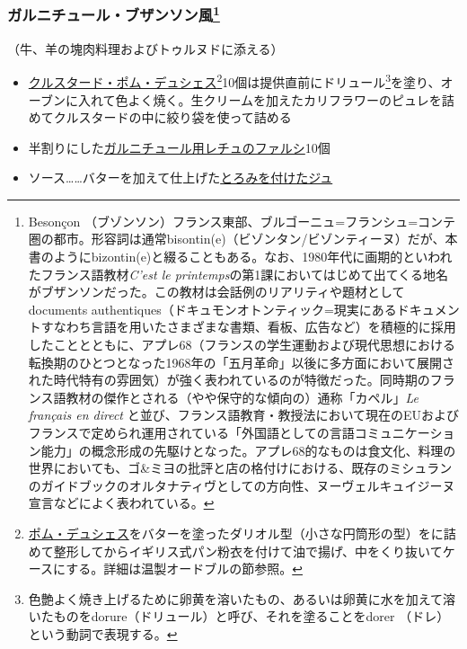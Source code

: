 \begin{recette}
\hypertarget{garniture-bezontinne}{%
\subsubsection[ガルニチュール・ブザンソン風]{\texorpdfstring{ガルニチュール・ブザンソン風\footnote{Besonçon
  （ブゾンソン）フランス東部、ブルゴーニュ=フランシュ=コンテ圏の都市。形容詞は通常bisontin(e)（ビゾンタン/ビゾンティーヌ）だが、本書のようにbizontin(e)と綴ることもある。なお、1980年代に画期的といわれたフランス語教材\emph{C'est
  le
  printemps}の第1課においてはじめて出てくる地名がブザンソンだった。この教材は会話例のリアリティや題材としてdocuments
  authentiques（ドキュモンオトンティック=現実にあるドキュメントすなわち言語を用いたさまざまな書類、看板、広告など）を積極的に採用したこととともに、アプレ68（フランスの学生運動および現代思想における転換期のひとつとなった1968年の「五月革命」以後に多方面において展開された時代特有の雰囲気）が強く表われているのが特徴だった。同時期のフランス語教材の傑作とされる（やや保守的な傾向の）通称「カペル」\emph{Le
  français en direct}
  と並び、フランス語教育・教授法において現在のEUおよびフランスで定められ運用されている「外国語としての言語コミュニケーション能力」の概念形成の先駆けとなった。アプレ68的なものは食文化、料理の世界においても、ゴ\&ミヨの批評と店の格付けにおける、既存のミシュランのガイドブックのオルタナティヴとしての方向性、ヌーヴェルキュイジーヌ宣言などによく表われている。}}{ガルニチュール・ブザンソン風}}\label{garniture-bezontinne}}



（牛、羊の塊肉料理およびトゥルヌドに添える）

\begin{itemize}
\item
  \protect\hyperlink{croustade-en-pomme-duchesse}{クルスタード・ポム・デュシェス}\footnote{\protect\hyperlink{pomme-de-terre-duchesse}{ポム・デュシェス}をバターを塗ったダリオル型（小さな円筒形の型）をに詰めて整形してからイギリス式パン粉衣を付けて油で揚げ、中をくり抜いてケースにする。詳細は温製オードブルの節参照。}10個は提供直前にドリュール\footnote{色艶よく焼き上げるために卵黄を溶いたもの、あるいは卵黄に水を加えて溶いたものをdorure（ドリュール）と呼び、それを塗ることをdorer
    （ドレ）という動詞で表現する。}を塗り、オーブンに入れて色よく焼く。生クリームを加えたカリフラワーのピュレを詰めてクルスタードの中に絞り袋を使って詰める
\item
  半割りにした\protect\hyperlink{laitues-farcies-pour-garniture}{ガルニチュール用レチュのファルシ}10個
\item
  ソース\ldots{}\ldots{}バターを加えて仕上げた\protect\hyperlink{jus-de-veau-lie}{とろみを付けたジュ}
\end{itemize}


\end{recette}
